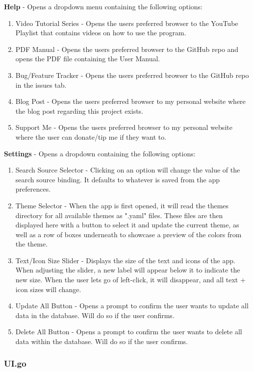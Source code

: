 \textbf{Help} - Opens a dropdown menu containing the following options:
\begin{enumerate}
	\item Video Tutorial Series - Opens the users preferred browser to
		the YouTube Playlist that contains videos on how to use the program.
	\item PDF Manual - Opens the users preferred browser to the GitHub
		repo and opens the PDF file containing the User Manual.
	\item Bug/Feature Tracker - Opens the users preferred browser to the
		GitHub repo in the issues tab.
	\item Blog Post - Opens the users preferred browser to my personal
		website where the blog post regarding this project exists.
	\item Support Me - Opens the users preferred browser to my personal
		website where the user can donate/tip me if they want to.
\end{enumerate}

\textbf{Settings} - Opens a dropdown containing the following options:
\begin{enumerate}
	\item Search Source Selector - Clicking on an option will change the
		value of the search source binding. It defaults to whatever is
		saved from the app preferences.
	\item Theme Selector - When the app is first opened, it will read
		the themes directory for all available themes as ".yaml" files.
		These files are then displayed here with a button to select it and
		update the current theme, as well as a row of boxes underneath to
		showcase a preview of the colors from the theme.
	\item Text/Icon Size Slider - Displays the size of the text and icons
		of the app. When adjusting the slider, a new label will appear
		below it to indicate the new size. When the user lets go of
		left-click, it will disappear, and all text + icon sizes will change.
	\item Update All Button - Opens a prompt to confirm the user wants
		to update all data in the database. Will do so if the user confirms.
	\item Delete All Button - Opens a prompt to confirm the user wants
		to delete all data within the database. Will do so if the user confirms.
\end{enumerate}

\subsubsection{UI.go}
\label{subsubsec:UI}

